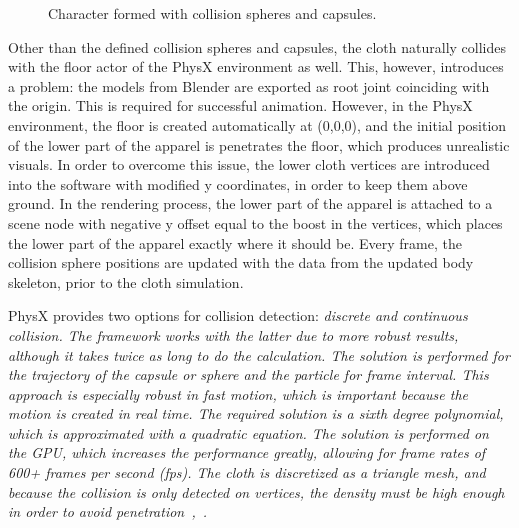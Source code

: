 \begin{figure}[ht]
\centerline{}
\caption{Character formed with collision spheres and capsules.}
\label{fig:colliding_human_body}
\end{figure}

Other than the defined collision spheres and capsules, the cloth naturally collides with the floor actor of the PhysX environment as well. This, however, introduces a problem: the models from Blender are exported as root joint coinciding with the origin. This is required for successful animation. However, in the PhysX environment, the floor is created automatically at (0,0,0), and the initial position of the lower part of the apparel is penetrates the floor, which produces unrealistic visuals. In order to overcome this issue, the lower cloth vertices are introduced into the software with modified y coordinates, in order to keep them above ground. In the rendering process, the lower part of the apparel is attached to a scene node with negative y offset equal to the boost in the vertices, which places the lower part of the apparel exactly where it should be. Every frame, the collision sphere positions are updated with the data from the updated body skeleton, prior to the cloth simulation. 

PhysX provides two options for collision detection: \em{discrete} and \em{continuous} collision. The framework works with the latter due to more robust results, although it takes twice as long to do the calculation. The solution is performed for the trajectory of the capsule or sphere and the particle for frame interval. This approach is especially robust in fast motion, which is important because the motion is created in real time. The required solution is a sixth degree polynomial, which is approximated with a quadratic equation. The solution is performed on the GPU, which increases the performance greatly, allowing for frame rates of 600+ frames per second (fps). The cloth is discretized as a triangle mesh, and because the collision is only detected on vertices, the density must be high enough in order to avoid penetration~\cite{Kim2011},~\cite{Tonge2010}. 

